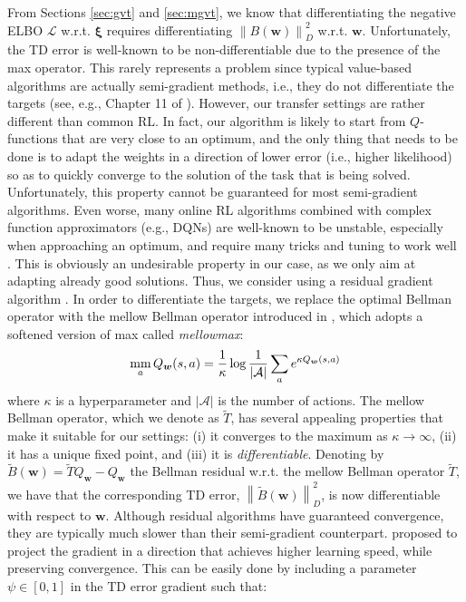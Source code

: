 \documentclass{article}
\newcommand{\mm}{\operatornamewithlimits{mm}}
\newcommand{\wt}[1]{\widetilde{#1}}
\newcommand{\norm}[1]{\left\lVert #1 \right\rVert}
\begin{document}
From Sections \ref{sec:gvt} and \ref{sec:mgvt}, we know that differentiating the negative ELBO $\mathcal{L}$ w.r.t. $\bm{\xi}$ requires differentiating $\norm{B(\bm{w})}_D^2$ w.r.t. $\bm{w}$. Unfortunately, the TD error is well-known to be non-differentiable due to the presence of the max operator. This rarely represents a problem since typical value-based algorithms are actually semi-gradient methods, i.e., they do not differentiate the targets (see, e.g., Chapter 11 of \cite{sutton1998reinforcement}). However, our transfer settings are rather different than common RL. In fact, our algorithm is likely to start from $Q$-functions that are very close to an optimum, and the only thing that needs to be done is to adapt the weights in a direction of lower error (i.e., higher likelihood) so as to quickly converge to the solution of the task that is being solved. Unfortunately, this property cannot be guaranteed for most semi-gradient algorithms. Even worse, many online RL algorithms combined with complex function approximators (e.g., DQNs) are well-known to be unstable, especially when approaching an optimum, and require many tricks and tuning to work well \cite{schaul2015prioritized,van2016deep}. This is obviously an undesirable property in our case, as we only aim at adapting already good solutions. Thus, we consider using a residual gradient algorithm \cite{baird1995residual}. In order to differentiate the targets, we replace the optimal Bellman operator with the mellow Bellman operator introduced in \cite{asadi2017alternative}, which adopts a softened version of max called \textit{mellowmax}:
\begin{equation}
\mm_a Q_{\bm{w}}(s,a) = \frac{1}{\kappa} \log \frac{1}{|\mathcal{A}|}\sum_a e^{\kappa Q_{\bm{w}}(s,a)}
\end{equation}
where $\kappa$ is a hyperparameter and $|\mathcal{A}|$ is the number of actions. The mellow Bellman operator, which we denote as $\wt{T}$, has several appealing properties that make it suitable for our settings: (i) it converges to the maximum as $\kappa \rightarrow \infty$, (ii) it has a unique fixed point, and (iii) it is \textit{differentiable}. Denoting by $\wt{B}(\bm{w}) = \wt{T}Q_{\bm{w}} - Q_{\bm{w}}$ the Bellman residual w.r.t. the mellow Bellman operator $\wt{T}$, we have that the corresponding TD error, $\norm{\wt{B}(\bm{w})}_D^2$, is now differentiable with respect to $\bm{w}$. Although residual algorithms have guaranteed convergence, they are typically much slower than their semi-gradient counterpart. \cite{baird1995residual} proposed to project the gradient in a direction that achieves higher learning speed, while preserving convergence. This can be easily done by including a parameter $\psi\in[0,1]$ in the TD error gradient such that:
\end{document}
